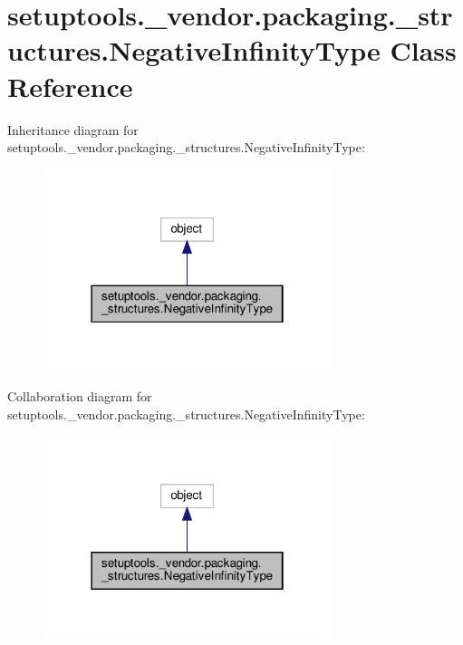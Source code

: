 \hypertarget{classsetuptools_1_1__vendor_1_1packaging_1_1__structures_1_1NegativeInfinityType}{}\section{setuptools.\+\_\+vendor.\+packaging.\+\_\+structures.\+Negative\+Infinity\+Type Class Reference}
\label{classsetuptools_1_1__vendor_1_1packaging_1_1__structures_1_1NegativeInfinityType}


Inheritance diagram for setuptools.\+\_\+vendor.\+packaging.\+\_\+structures.\+Negative\+Infinity\+Type\+:
\nopagebreak
\begin{figure}[H]
\begin{center}
\leavevmode
\includegraphics[width=238pt]{classsetuptools_1_1__vendor_1_1packaging_1_1__structures_1_1NegativeInfinityType__inherit__graph}
\end{center}
\end{figure}


Collaboration diagram for setuptools.\+\_\+vendor.\+packaging.\+\_\+structures.\+Negative\+Infinity\+Type\+:
\nopagebreak
\begin{figure}[H]
\begin{center}
\leavevmode
\includegraphics[width=238pt]{classsetuptools_1_1__vendor_1_1packaging_1_1__structures_1_1NegativeInfinityType__coll__graph}
\end{center}
\end{figure}
